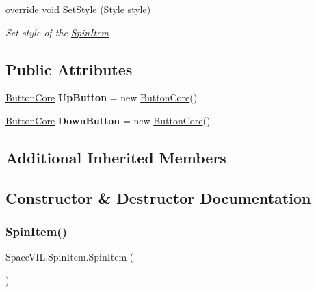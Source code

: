 \begin{DoxyCompactItemize}
override void \mbox{\hyperlink{class_space_v_i_l_1_1_spin_item_a4a1bd42da119fb072ed70c1026740591}{Set\+Style}} (\mbox{\hyperlink{class_space_v_i_l_1_1_decorations_1_1_style}{Style}} style)
\begin{DoxyCompactList}\small\item\em Set style of the \mbox{\hyperlink{class_space_v_i_l_1_1_spin_item}{Spin\+Item}} \end{DoxyCompactList}\end{DoxyCompactItemize}
\subsection*{Public Attributes}
\begin{DoxyCompactItemize}
\item 
\mbox{\label{class_space_v_i_l_1_1_spin_item_a7e1fb803e2c0ce9980fb8d4ace88326e}} 
\mbox{\hyperlink{class_space_v_i_l_1_1_button_core}{Button\+Core}} {\bfseries Up\+Button} = new \mbox{\hyperlink{class_space_v_i_l_1_1_button_core}{Button\+Core}}()
\item 
\mbox{\label{class_space_v_i_l_1_1_spin_item_a2bbc136b9f697401c735049514045bbc}} 
\mbox{\hyperlink{class_space_v_i_l_1_1_button_core}{Button\+Core}} {\bfseries Down\+Button} = new \mbox{\hyperlink{class_space_v_i_l_1_1_button_core}{Button\+Core}}()
\end{DoxyCompactItemize}
\subsection*{Additional Inherited Members}


\subsection{Constructor \& Destructor Documentation}
\mbox{\label{class_space_v_i_l_1_1_spin_item_aad1c32a29142563435b0b222d320fc99}} 
\subsubsection{\texorpdfstring{Spin\+Item()}{SpinItem()}}
{\footnotesize\ttfamily Space\+V\+I\+L.\+Spin\+Item.\+Spin\+Item (\begin{DoxyParamCaption}{ }\end{DoxyParamCaption})}



